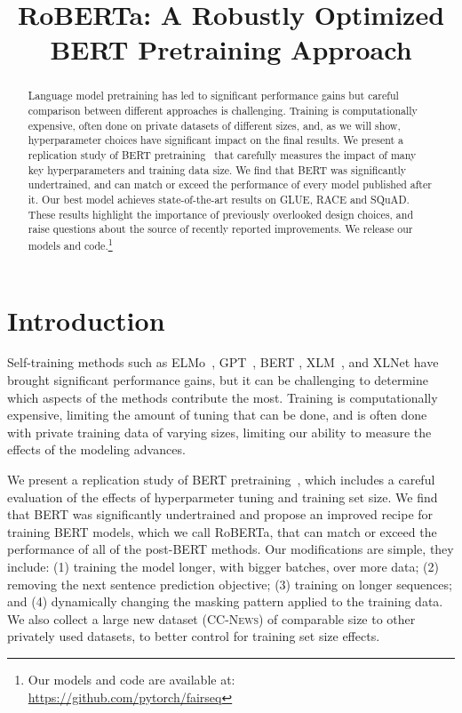 \title{RoBERTa: A Robustly Optimized BERT Pretraining Approach}

\begin{abstract}
Language model pretraining has led to significant performance gains but careful comparison between different approaches is challenging. Training is computationally expensive, often done on private datasets of different sizes, and, as we will show, hyperparameter choices have significant impact on the final results. We present a replication study of BERT pretraining~\cite{devlin2018bert} that carefully measures the impact of many key hyperparameters and training data size. We find that BERT was significantly undertrained, and can match or exceed the performance of every model published after it. Our best model achieves state-of-the-art results on GLUE, RACE and SQuAD. These results highlight the importance of previously overlooked design choices, and raise questions about the source of recently reported improvements. We release our models and code.\footnote{Our models and code are available at: \\
\url{https://github.com/pytorch/fairseq}}
\end{abstract}

\section{Introduction}
\label{intro}

Self-training methods such as ELMo~\cite{peters2018deep}, GPT~\cite{radford2018gpt}, BERT \cite{devlin2018bert}, XLM~\cite{lample2019cross}, and XLNet \cite{yang2019xlnet} have brought significant performance gains, but it can be challenging to determine which aspects of the methods contribute the most. Training is computationally expensive, limiting the amount of tuning that can be done, and is often done with private training data of varying sizes, limiting our ability to measure the effects of the modeling advances. 

We present a replication study of BERT pretraining~\cite{devlin2018bert}, which includes a careful evaluation of the effects of hyperparmeter tuning and training set size. We find that BERT was significantly undertrained and propose an improved recipe for training BERT models, which we call RoBERTa, that can match or exceed the performance of all of the post-BERT methods. Our modifications are simple, they include: (1) training the model longer, with bigger batches, over more data; (2) removing the next sentence prediction objective; (3) training on longer sequences; and (4) dynamically changing the masking pattern applied to the training data. We also collect a large new dataset (\textsc{CC-News}) of comparable size to other privately used datasets, to better control for training set size effects. 

